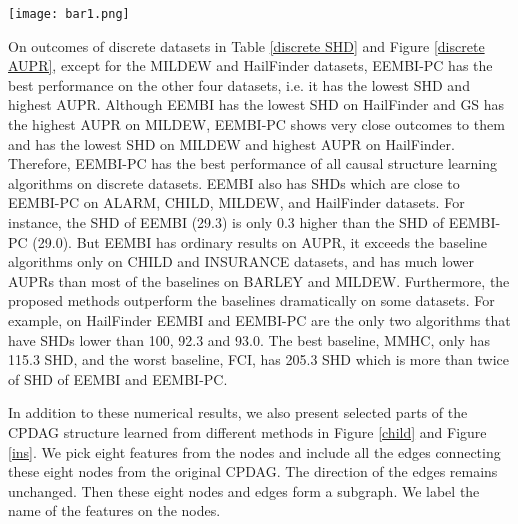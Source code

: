 \documentclass[twoside,11pt]{article}
\begin{document}
\begin{figure*}[htpb]
\centering
\texttt{[image: bar1.png]}
\caption{AUPR results of causal structure learning methods on discrete datasets}\label{discrete AUPR}
\end{figure*}


On outcomes of discrete datasets in Table \ref{discrete SHD} and Figure \ref{discrete AUPR}, except for the MILDEW and HailFinder datasets, EEMBI-PC has the best performance on the other four datasets, i.e. it has the lowest SHD and highest AUPR. Although EEMBI has the lowest SHD on HailFinder and GS has the highest AUPR on MILDEW, EEMBI-PC shows very close outcomes to them and has the lowest SHD on MILDEW and highest AUPR on HailFinder. Therefore, EEMBI-PC has the best performance of all causal structure learning algorithms on discrete datasets. EEMBI also has SHDs which are close to EEMBI-PC on ALARM, CHILD, MILDEW, and HailFinder datasets. For instance, the SHD of EEMBI (29.3) is only 0.3 higher than the SHD of EEMBI-PC (29.0). But EEMBI has ordinary results on AUPR, it exceeds the baseline algorithms only on CHILD and INSURANCE datasets, and has much lower AUPRs than most of the baselines on BARLEY and MILDEW. Furthermore, the proposed methods outperform the baselines dramatically on some datasets. For example, on HailFinder EEMBI and EEMBI-PC are the only two algorithms that have SHDs lower than 100, 92.3 and 93.0. The best baseline, MMHC, only has 115.3 SHD, and the worst baseline, FCI, has 205.3 SHD which is more than twice of SHD of EEMBI and EEMBI-PC. 




In addition to these numerical results, we also present selected parts of the CPDAG structure learned from different methods in Figure \ref{child} and Figure \ref{ins}. We pick eight features from the nodes and include all the edges connecting these eight nodes from the original CPDAG. The direction of the edges remains unchanged. Then these eight nodes and edges form a subgraph. We label the name of the features on the nodes. 
\end{document}
